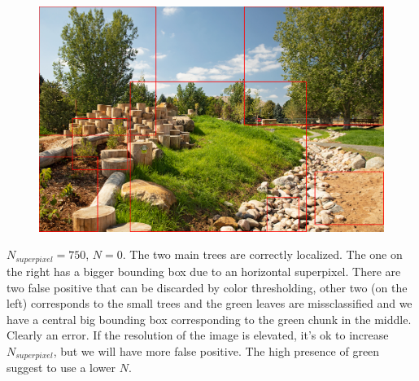 \documentclass[a4paper,titlepaget]{article}
\begin{document}
\begin{figure}[htpb]
	\centering
	\includegraphics[width=.9\textwidth]{images/results/3fin}
\end{figure}
$N_{superpixel}=750$, $N=0$. The two main trees are correctly localized. The one on the right has a bigger bounding box due to an horizontal superpixel. There are two false positive that can be discarded by color thresholding, other two (on the left) corresponds to the small trees and the green leaves are missclassified and we have a central big bounding box corresponding to the green chunk in the middle. Clearly an error. If the resolution of the image is elevated, it's ok to increase $N_{superpixel}$, but we will have more false positive. The high presence of green suggest to use a lower $N$. 
\newpage
\end{document}
